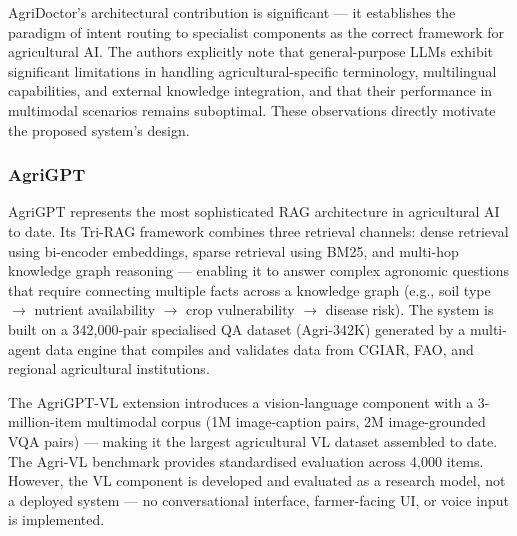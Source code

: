 \documentclass[12pt,a4paper]{article}
\begin{document}
AgriDoctor's architectural contribution is significant --- it establishes the paradigm of intent routing to specialist components as the correct framework for agricultural AI. The authors explicitly note that general-purpose LLMs exhibit significant limitations in handling agricultural-specific terminology, multilingual capabilities, and external knowledge integration, and that their performance in multimodal scenarios remains suboptimal. These observations directly motivate the proposed system's design.


\subsubsection{AgriGPT \cite{agrigpt2025}}
AgriGPT represents the most sophisticated RAG architecture in agricultural AI to date. Its Tri-RAG framework combines three retrieval channels: dense retrieval using bi-encoder embeddings, sparse retrieval using BM25, and multi-hop knowledge graph reasoning --- enabling it to answer complex agronomic questions that require connecting multiple facts across a knowledge graph (e.g., soil type $\to$ nutrient availability $\to$ crop vulnerability $\to$ disease risk). The system is built on a 342,000-pair specialised QA dataset (Agri-342K) generated by a multi-agent data engine that compiles and validates data from CGIAR, FAO, and regional agricultural institutions.

The AgriGPT-VL extension \cite{agrigptvl2025} introduces a vision-language component with a 3-million-item multimodal corpus (1M image-caption pairs, 2M image-grounded VQA pairs) --- making it the largest agricultural VL dataset assembled to date. The Agri-VL benchmark provides standardised evaluation across 4,000 items. However, the VL component is developed and evaluated as a research model, not a deployed system --- no conversational interface, farmer-facing UI, or voice input is implemented.
\end{document}
